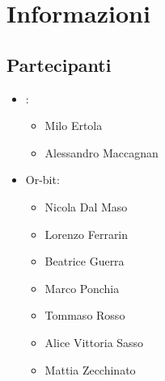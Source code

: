\section{Informazioni}
\subsection{Partecipanti}

\begin{itemize}
	\item \Proponente:
	\begin{itemize}
		\item Milo Ertola
		\item Alessandro Maccagnan 
	\end{itemize}
	\item Or-bit:
	\begin{itemize}
		\item Nicola Dal Maso
		\item Lorenzo Ferrarin
		\item Beatrice Guerra
		\item Marco Ponchia
		\item Tommaso Rosso
		\item Alice Vittoria Sasso
		\item Mattia Zecchinato
	\end{itemize}
\end{itemize}

\clearpage


